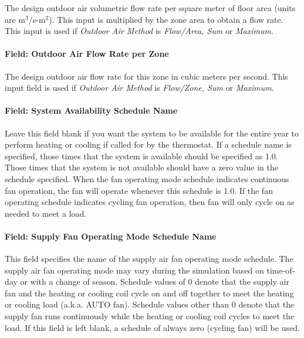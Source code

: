 The design outdoor air volumetric flow rate per square meter of floor area (units are m\(^{3}\)/s-m\(^{2}\)). This input is multiplied by the zone area to obtain a flow rate. This input is used if \emph{Outdoor Air Method} is \emph{Flow/Area, Sum} or \emph{Maximum}.

\paragraph{Field: Outdoor Air Flow Rate per Zone}\label{field-outdoor-air-flow-rate-per-zone-4}

The design outdoor air flow rate for this zone in cubic meters per second. This input field is used if \emph{Outdoor Air Method} is \emph{Flow/Zone, Sum} or \emph{Maximum}.

\paragraph{Field: System Availability Schedule Name}\label{field-system-availability-schedule-name-3}

Leave this field blank if you want the system to be available for the entire year to perform heating or cooling if called for by the thermostat. If a schedule name is specified, those times that the system is available should be specified as 1.0. Those times that the system is not available should have a zero value in the schedule specified. When the fan operating mode schedule indicates continuous fan operation, the fan will operate whenever this schedule is 1.0. If the fan operating schedule indicates cycling fan operation, then fan will only cycle on as needed to meet a load.

\paragraph{Field: Supply Fan Operating Mode Schedule Name}\label{field-supply-fan-operating-mode-schedule-name-1}

This field specifies the name of the supply air fan operating mode schedule. The supply air fan operating mode may vary during the simulation based on time-of-day or with a change of season. Schedule values of 0 denote that the supply air fan and the heating or cooling coil cycle on and off together to meet the heating or cooling load (a.k.a. AUTO fan). Schedule values other than 0 denote that the supply fan runs continuously while the heating or cooling coil cycles to meet the load. If this field is left blank, a schedule of always zero (cycling fan) will be used.

